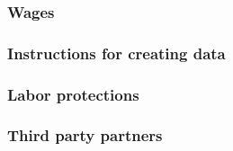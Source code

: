 \documentclass{article}
\begin{document}
\subsubsection{Wages}

\subsubsection{Instructions for creating data}

\subsubsection{Labor protections}

\subsubsection{Third party partners}
\end{document}
